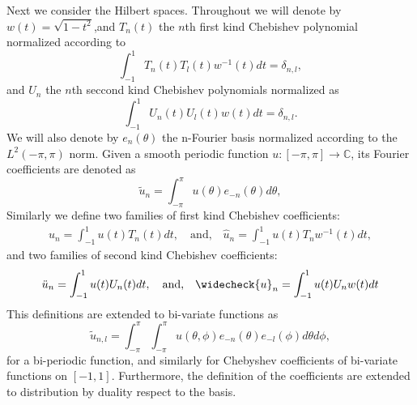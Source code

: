 \documentclass{article}
\newcommand{\IC}{{\mathbb C}}
\begin{document}
Next we consider the Hilbert spaces. Throughout we will denote by $w(t) = \sqrt{1-t^2}$,and $T_n(t)$ the $n$th first kind Chebishev polynomial normalized according to $$\int_{-1}^1 T_n(t) T_l(t) w^{-1}(t) dt = \delta_{n,l},$$ and $U_n$ the $n$th seccond kind Chebishev polynomials normalized as 
$$\int_{-1}^1 U_n(t) U_l(t) w(t) dt = \delta_{n,l}.$$
 We will also denote by $e_n(\theta)$ the n-Fourier basis normalized according to the $L^2(-\pi,\pi)$ norm. 
Given a smooth periodic function $u :[-\pi,\pi] \rightarrow \IC$, its Fourier coefficients are denoted as
$$
\widetilde{u}_n = \int_{-\pi}^\pi u(\theta) e_{-n}(\theta) d\theta, 
$$
Similarly we define two families of first kind Chebishev coefficients:
\begin{align*}
u_n = \int_{-1}^{1} u(t) T_n(t) dt, \quad \text{and,} \quad  \widehat{u}_n = \int_{-1}^1 u(t) T_n w^{-1}(t)dt, 
\end{align*}
and two families of second kind Chebishev coefficients:
\begin{align*}
\ddot{u}_n = \int_{-1}^1 u(t) U_n (t) dt,\quad \text{and,}\quad \widecheck{u} _n = \int_{-1}^1 u(t) U_n w(t) dt
\end{align*}
This definitions are extended to bi-variate functions as 
$$\widetilde{u}_{n,l} = \int_{-\pi}^{\pi}\int_{-\pi}^\pi u(\theta,\phi) e_{-n}(\theta)e_{-l}(\phi) d\theta d\phi,$$
for a bi-periodic function, and similarly  for Chebyshev coefficients of  bi-variate functions on $[-1,1]$. Furthermore, the definition of the coefficients are extended to distribution by duality respect to the basis. 
\end{document}
